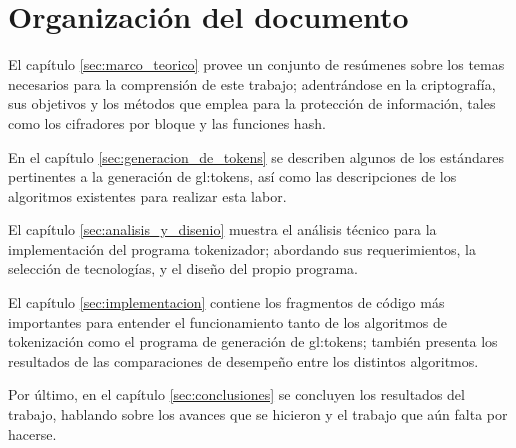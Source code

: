 
\section{Organización del documento}

El capítulo \ref{sec:marco_teorico} provee un conjunto de resúmenes sobre los
temas necesarios para la comprensión de este trabajo; adentrándose en la
criptografía, sus objetivos y los métodos que emplea para la protección de
información, tales como los cifradores por bloque y las funciones hash.

En el capítulo \ref{sec:generacion_de_tokens} se describen algunos de los
estándares pertinentes a la generación de \glspl{gl:token}, así como las
descripciones de los algoritmos existentes para realizar esta labor.

El capítulo \ref{sec:analisis_y_disenio} muestra el análisis técnico para
la implementación del programa tokenizador; abordando sus requerimientos,
la selección de tecnologías, y el diseño del propio programa.

El capítulo \ref{sec:implementacion} contiene los fragmentos de código más
importantes para entender el funcionamiento tanto de los algoritmos de
tokenización como el programa de generación de \glspl{gl:token}; también
presenta los resultados de las comparaciones de desempeño entre los
distintos algoritmos.

Por último, en el capítulo \ref{sec:conclusiones} se concluyen los resultados
del trabajo, hablando sobre los avances que se hicieron y el trabajo que aún
falta por hacerse.
